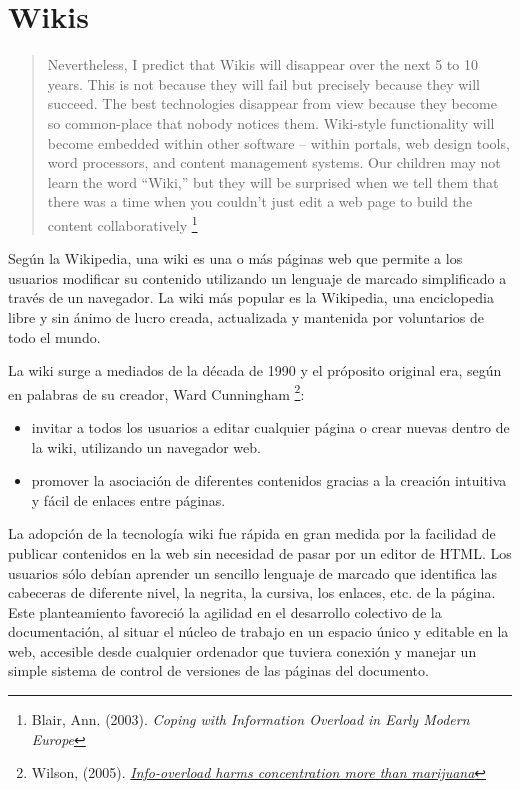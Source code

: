 \documentclass[12pt, a4paper,twoside]{book}
\begin{document}
\section{Wikis}

\begin{quote}
Nevertheless, I predict that Wikis will disappear over the next 5
to 10 years. This is not because they will fail but precisely
because they will succeed. The best technologies disappear from
view because they become so common-place that nobody notices them.
Wiki-style functionality will become embedded within other software
– within portals, web design tools, word processors, and content
management systems. Our children may not learn the word ``Wiki,''
but they will be surprised when we tell them that there was a time
when you couldn't just edit a web page to build the content
collaboratively%
\footnote{Blair, Ann. (2003).
\emph{Coping with Information Overload in Early Modern Europe}}

\end{quote}
Según la Wikipedia, una wiki es una o más páginas web que permite a
los usuarios modificar su contenido utilizando un lenguaje de
marcado simplificado a través de un navegador. La wiki más popular
es la Wikipedia, una enciclopedia libre y sin ánimo de lucro
creada, actualizada y mantenida por voluntarios de todo el mundo.

La wiki surge a mediados de la década de 1990 y el próposito
original era, según en palabras de su creador, Ward Cunningham%
\footnote{Wilson, (2005).
\emph{\href{http://www.newscientist.com/article/mg18624973.400}{Info-overload harms concentration more than marijuana}}}:

\begin{itemize}
\item
  invitar a todos los usuarios a editar cualquier página o crear
  nuevas dentro de la wiki, utilizando un navegador web.
\item
  promover la asociación de diferentes contenidos gracias a la
  creación intuitiva y fácil de enlaces entre páginas.
\end{itemize}
La adopción de la tecnología wiki fue rápida en gran medida por la
facilidad de publicar contenidos en la web sin necesidad de pasar
por un editor de HTML. Los usuarios sólo debían aprender un
sencillo lenguaje de marcado que identifica las cabeceras de
diferente nivel, la negrita, la cursiva, los enlaces, etc. de la
página. Este planteamiento favoreció la agilidad en el desarrollo
colectivo de la documentación, al situar el núcleo de trabajo en un
espacio único y editable en la web, accesible desde cualquier
ordenador que tuviera conexión y manejar un simple sistema de
control de versiones de las páginas del documento.
\end{document}
